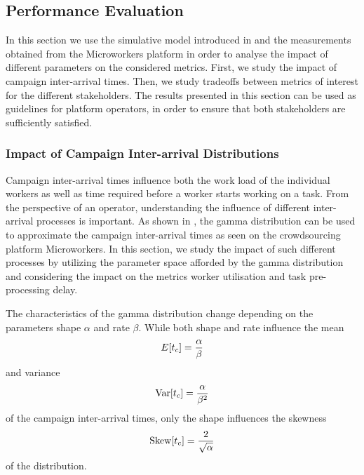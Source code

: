 \subsection{Performance Evaluation}\label{sec:cloud:crowdsourcing:performance_evaluation}

In this section we use the simulative model introduced in  and the measurements obtained from the Microworkers platform in order to analyse the impact of different parameters on the considered metrics.
First, we study the impact of campaign inter-arrival times.
Then, we study tradeoffs between metrics of interest for the different stakeholders.
The results presented in this section can be used as guidelines for platform operators, in order to ensure that both stakeholders are sufficiently satisfied.

\subsubsection*{Impact of Campaign Inter-arrival Distributions}

Campaign inter-arrival times influence both the work load of the individual workers as well as time required before a worker starts working on a task.
From the perspective of an operator, understanding the influence of different inter-arrival processes is important.
As shown in , the gamma distribution can be used to approximate the campaign inter-arrival times as seen on the crowdsourcing platform Microworkers.
In this section, we study the impact of such different processes by utilizing the parameter space afforded by the 
gamma distribution and considering the impact on the metrics worker utilisation and task pre-processing delay.

The characteristics of the gamma distribution change depending on the parameters shape \(\alpha\) and rate \(\beta\).
While both shape and rate influence the mean 
\begin{equation*}
E[t_c] =  \frac{\alpha}{\beta}
\end{equation*}
and variance 
\begin{equation*}
\operatorname{Var}[t_c] =  \frac{\alpha}{\beta^2}
\end{equation*}
of the campaign inter-arrival times, only the shape influences the skewness 
\begin{equation*}
\operatorname{Skew}[t_c] =  \frac{2}{\sqrt{\alpha}}
\end{equation*}
of the distribution. 

